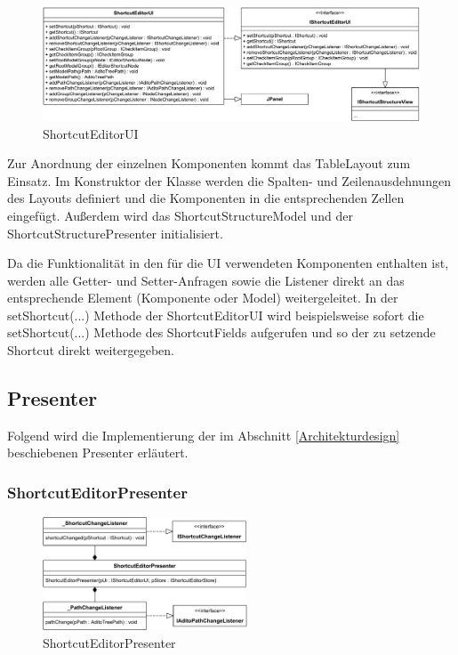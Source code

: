\begin{figure}[H]
	\centering
	\includegraphics[width=1\linewidth]{../graphic/diagrams/CD_ShortcutEditorUI/ShortcutEditorUI}
	\caption{ShortcutEditorUI}
	\label{fig:shortcuteditorui}
\end{figure} 

\vspace{-12px}

Zur Anordnung der einzelnen Komponenten kommt das TableLayout zum Einsatz. Im Konstruktor der Klasse werden die Spalten- und Zeilenausdehnungen des Layouts definiert und die Komponenten in die entsprechenden Zellen eingefügt. Außerdem wird das ShortcutStructureModel und der ShortcutStructurePresenter initialisiert. 

Da die Funktionalität in den für die UI verwendeten Komponenten enthalten ist, werden alle Getter- und Setter-Anfragen sowie die Listener direkt an das entsprechende Element (Komponente oder Model) weitergeleitet. In der setShortcut(...) Methode der ShortcutEditorUI wird beispielsweise sofort die setShortcut(...) Methode des ShortcutFields aufgerufen und so der zu setzende Shortcut direkt weitergegeben.

\newpage

\subsection{Presenter}

Folgend wird die Implementierung der im Abschnitt \ref{Architekturdesign} beschiebenen Presenter erläutert.

\subsubsection{ShortcutEditorPresenter}

\begin{figure}
	\vspace{-12px}
	\centering
	\includegraphics[width=230px]{../graphic/diagrams/CD_ShortcutEditorPresenter/ShortcutEditorPresenter}
	\caption{ShortcutEditorPresenter}
	\label{fig:shortcuteditorpresenter}
\end{figure}

